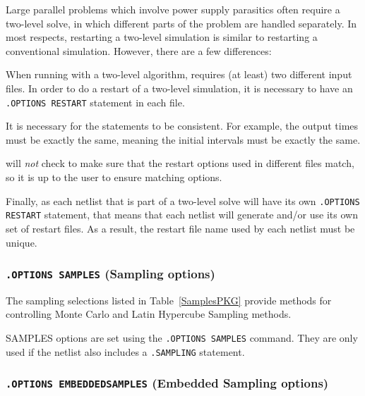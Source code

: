 Large parallel problems which involve power supply parasitics often
require a two-level solve, in which different parts of the problem
are handled separately.  In most respects, restarting a two-level
simulation is similar to restarting a conventional simulation.
However, there are a few differences:

\begin{XyceItemize}
\item When running with a two-level algorithm, \Xyce{} requires (at least) two
different input files.  In order to do a restart of a two-level \Xyce{}
simulation, it is necessary to have an \texttt{.OPTIONS RESTART} statement
in each file.

\item It is necessary for the statements to be consistent.  For example,
the output times must be exactly the same, meaning the initial intervals
must be exactly the same.

\item \Xyce{} will \emph{not} check to make sure that the restart
options used in different files match, so it is up to the user to ensure
matching options.

\item Finally, as each netlist that is part of a two-level solve will have its
own \texttt{.OPTIONS RESTART} statement, that means that each netlist
will generate and/or use its own set of restart files.  As a result,
the restart file name used by each netlist must be unique.
\end{XyceItemize}

\subsubsection{\texttt{.OPTIONS SAMPLES} (Sampling options)}

The sampling selections listed in Table~\ref{SamplesPKG}
provide methods for controlling Monte Carlo and Latin Hypercube Sampling methods.

SAMPLES options are set using the \texttt{.OPTIONS SAMPLES} command. 
They are only used if the netlist also includes a \texttt{.SAMPLING} statement. 



\subsubsection{\texttt{.OPTIONS EMBEDDEDSAMPLES} (Embedded Sampling options)}

